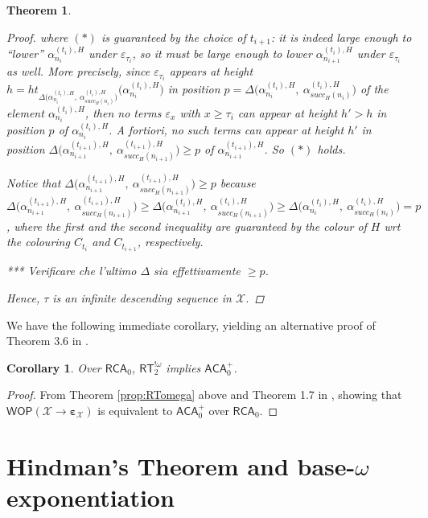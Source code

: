 \documentclass{amsart}
\newcommand\RCA{\mathsf{RCA}}
\newcommand\ACA{\mathsf{ACA}}
\newcommand\RT{\mathsf{RT}}
\newcommand\WOP{\mathsf{WOP}}
\newcommand{\LoX}{\mathcal{X}}
\newcommand\boldepsilon{\pmb{\varepsilon}}
\newtheorem{theorem}{Theorem}
\newtheorem{corollary}{Corollary}
\begin{document}
\begin{theorem}
\begin{proof}
where $(*)$ is guaranteed by the choice of $t_{i+1}$: it is indeed large enough to ``lower'' $\alpha_{n_i}^{(t_i),H}$ under $\varepsilon_{\tau_i}$, so it must be large enough to lower $\alpha_{n_{i+1}}^{(t_i),H}$ under $\varepsilon_{\tau_i}$ as well. More precisely, since $\varepsilon_{\tau_i}$ appears at height $h = ht_{\Delta\big(\alpha_{n_i}^{(t_i),H},\ \alpha_{succ_H(n_i)}^{(t_i),H}\big)}\big(\alpha_{n_i}^{(t_i),H}\big)$ in position $p = \Delta\big(\alpha_{n_i}^{(t_i),H},\ \alpha_{succ_H(n_i)}^{(t_i),H}\big)$ of the element $\alpha_{n_i}^{(t_i),H}$, then no terms $\varepsilon_x$ with $x \geq \tau_i$ can appear at height $h'>h$ in position $p$ of $\alpha_{n_i}^{(t_i),H}$. A fortiori, no such terms can appear at height $h'$ in position $\Delta\big(\alpha_{n_{i+1}}^{(t_{i+1}),H},\ \alpha_{succ_H(n_{i+1})}^{(t_{i+1}),H}\big) \geq p$ of $\alpha_{n_{i+1}}^{(t_{i+1}),H}$. So $(*)$ holds.

Notice that $\Delta\big(\alpha_{n_{i+1}}^{(t_{i+1}),H},\ \alpha_{succ_H(n_{i+1})}^{(t_{i+1}),H}\big) \geq p$ because $\Delta\big(\alpha_{n_{i+1}}^{(t_{i+1}),H},\ \alpha_{succ_H(n_{i+1})}^{(t_{i+1}),H}\big) \geq \Delta\big(\alpha_{n_{i+1}}^{(t_i),H},\ \alpha_{succ_H(n_{i+1})}^{(t_i),H}\big) \geq \Delta\big(\alpha_{n_i}^{(t_i),H},\ \alpha_{succ_H(n_i)}^{(t_i),H}\big) = p$, where the first and the second inequality are guaranteed by the colour of $H$ wrt the colouring $C_{t_i}$ and $C_{t_{i+1}}$, respectively.

*** Verificare che l'ultimo $\Delta$ sia effettivamente $ \geq p$.


Hence, $\tau$ is an infinite descending sequence in $\LoX$.
\fi

\end{proof}
\end{theorem}

We have the following immediate corollary, yielding an alternative proof of Theorem 3.6 in \cite{Car-Zda:RT}.

\begin{corollary}
Over $\RCA_0$, $\RT^{!\omega}_2$ implies $\ACA_0^+$.
\end{corollary}

\begin{proof}
From Theorem \ref{prop:RTomega} above and Theorem 1.7 in \cite{Mar-Mon:11}, showing that $\WOP(\LoX \to \boldepsilon_\LoX)$ is equivalent to $\ACA_0^+$ over $\RCA_0$.
\end{proof}



\section{Hindman's Theorem and base-$\omega$ exponentiation}
\end{document}
